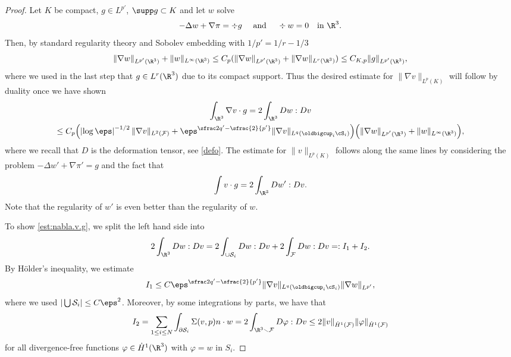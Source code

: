 \begin{proof}

Let $K$ be compact, $g \in L^{p'}$, $\supp g \subset K$ and let $w$ solve
\begin{equation*}
- \Delta w + \nabla \pi = \div g \quad \text{ and } \quad \div w = 0 \quad \text{in } \R^3.
\end{equation*}
Then, by standard regularity theory and Sobolev embedding with $1/{p'} = 1/r - 1/3$
\begin{equation}
\|\nabla w\|_{L^{p'}(\R^3)} + \|w\|_{L^\infty(\R^3)} \leq C_p (\|\nabla w\|_{L^{p'}(\R^3)} + \|\nabla w\|_{L^{r}(\R^3)}) \leq C_{K,p}\|g\|_{L^{p'}(\R^3)},
\end{equation}
where we used in the last step that $g \in L^r(\R^3)$ due to its compact support.
Thus the desired estimate for $\|\nabla v\|_{L^p(K)}$ will follow by duality once we have shown
\begin{multline} \label{est:nabla.v.g}
\int_{\R^3} \nabla v \cdot g
= 2 \int_{\R^3} D w : D v \\
\leq C_p \Bigl(\left|\log \eps\right|^{-1/2} \|\nabla v\|_{L^2(\mathcal F)} + {\eps^{\sfrac 2 {q'} - \sfrac{2}{p'}} \|\nabla v\|_{L^q(\oldbigcup_i \cS_i)}}\Bigr)
\Bigl(\|\nabla w\|_{L^{p'}(\R^3)} + \|w\|_{L^\infty(\R^3)} \Bigr),
\end{multline}
where we recall that $D$ is the deformation tensor, see \eqref{defo}.
The estimate for $\|v\|_{L^p(K)}$ follows along the same lines by considering the problem $- \Delta w' + \nabla \pi' = g$ and the fact that
\begin{equation*}
\int v \cdot g = 2 \int_{\R^3} D w' : D v.
\end{equation*}
Note that the regularity of $w'$ is even better than the regularity of $w$.

To show \eqref{est:nabla.v.g}, we split the left hand side into
\begin{equation}
2 \int_{\R^3} D w : D v = 2 \int_{\cup \mathcal S_i} D w : D v + 2 \int_{\mathcal F} D w : D v =:I_1 + I_2.
\end{equation}
By Hölder's inequality, we estimate
\begin{equation}
I_1 \leq C {\eps^{\sfrac 2 {q'} - \sfrac{2}{p'}} \|\nabla v\|_{L^q(\oldbigcup_i \cS_i)}} \|\nabla w\|_{L^{p'}},
\end{equation}
where we used $|\bigcup \mathcal S_i| \leq C \eps^2$.
Moreover, by some integrations by parts, we have that
\begin{equation}
I_2 = \sum_{1 \leq i \leq N} \int_{\partial \mathcal S_i} \Sigma(v,p) n \cdot w = 2 \int_{\R^3 \smallsetminus \mathcal F} D \varphi : D v
\leq 2 \|v\|_{\dot H^1(\mathcal F)} \|\varphi\|_{\dot H^1(\mathcal F)}
\end{equation}
for all divergence-free functions $\varphi \in \dot H^1(\R^3)$ with $\varphi = w$ in $S_i$.


\end{proof}
